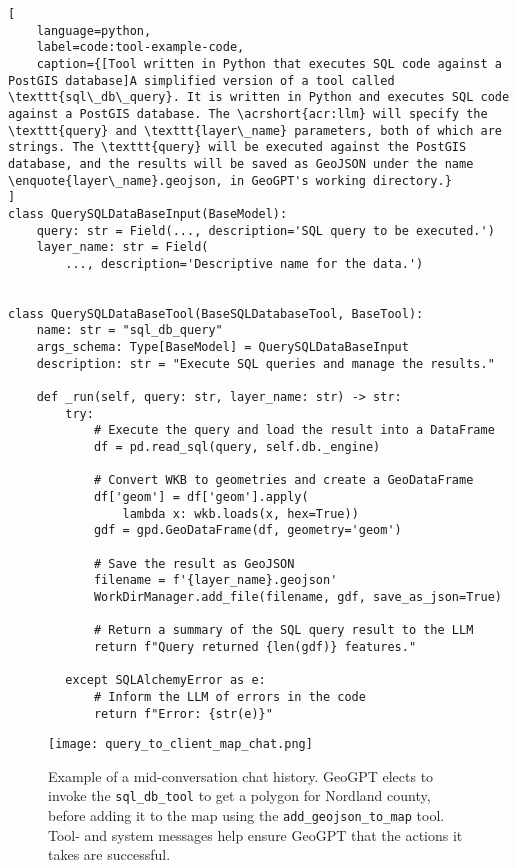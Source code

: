 \begin{lstlisting}[
    language=python,
    label=code:tool-example-code,
    caption={[Tool written in Python that executes SQL code against a PostGIS database]A simplified version of a tool called \texttt{sql\_db\_query}. It is written in Python and executes SQL code against a PostGIS database. The \acrshort{acr:llm} will specify the \texttt{query} and \texttt{layer\_name} parameters, both of which are strings. The \texttt{query} will be executed against the PostGIS database, and the results will be saved as GeoJSON under the name \enquote{layer\_name}.geojson, in GeoGPT's working directory.} 
]
class QuerySQLDataBaseInput(BaseModel):
    query: str = Field(..., description='SQL query to be executed.')
    layer_name: str = Field(
        ..., description='Descriptive name for the data.')


class QuerySQLDataBaseTool(BaseSQLDatabaseTool, BaseTool):
    name: str = "sql_db_query"
    args_schema: Type[BaseModel] = QuerySQLDataBaseInput
    description: str = "Execute SQL queries and manage the results."

    def _run(self, query: str, layer_name: str) -> str:
        try:
            # Execute the query and load the result into a DataFrame
            df = pd.read_sql(query, self.db._engine)

            # Convert WKB to geometries and create a GeoDataFrame
            df['geom'] = df['geom'].apply(
                lambda x: wkb.loads(x, hex=True))
            gdf = gpd.GeoDataFrame(df, geometry='geom')

            # Save the result as GeoJSON
            filename = f'{layer_name}.geojson'
            WorkDirManager.add_file(filename, gdf, save_as_json=True)

            # Return a summary of the SQL query result to the LLM
            return f"Query returned {len(gdf)} features."

        except SQLAlchemyError as e:
            # Inform the LLM of errors in the code
            return f"Error: {str(e)}"
\end{lstlisting}

\begin{figure}
    \centering
    \texttt{[image: query\_to\_client\_map\_chat.png]}
    \caption[Example of a chat history]{Example of a mid-conversation chat history. GeoGPT elects to invoke the \texttt{sql\_db\_tool} to get a polygon for Nordland county, before adding it to the map using the \texttt{add\_geojson\_to\_map} tool. Tool- and system messages help ensure GeoGPT that the actions it takes are successful.}
    \label{fig:chat-trace-example}
\end{figure}


